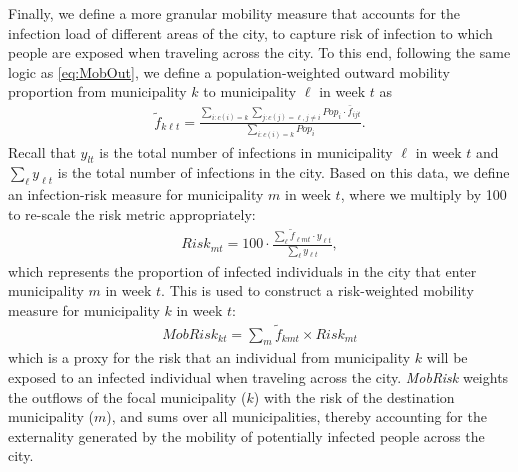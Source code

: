 
Finally, we define a more granular mobility measure that accounts for the infection load of different areas of the city, to capture risk of infection to which people are exposed when traveling across the city. To this end, following the same logic as \eqref{eq:MobOut},
we define a population-weighted outward mobility proportion from municipality $k$ to municipality $\ell$ in week $t$ as
\begin{align*}
    \tilde f_{k\ell t}=\frac{\sum_{i:c(i)=k}\sum_{j:c(j)=\ell, j\neq i}Pop_i\cdot \bar f_{ijt}}{\sum_{i:c(i)=k}Pop_i}.
\end{align*}
Recall that $y_{lt}$ is the total number of infections in municipality $\ell$ in week $t$ and $\sum_{\ell}  y_{\ell t}$ is the total number of infections in the city. Based on this data, we define an infection-risk measure for municipality $m$ in week $t$, where we multiply by 100 to re-scale the risk metric appropriately: 
\begin{align*}
     Risk_{mt}=100\cdot\frac{\sum_{\ell}\tilde f_{\ell mt}\cdot y_{\ell t}}{\sum_{\ell}y_{\ell t}} ,
\end{align*}
which represents the proportion of infected individuals in the city that enter municipality $m$ in week $t$. This is used to construct a risk-weighted mobility measure for municipality $k$ in week $t$:
\begin{align*}
    MobRisk_{kt}=\sum_{m}\tilde f_{kmt}\times Risk_{mt}  %
\end{align*}
which is a proxy for the risk that an individual from municipality $k$ will be exposed to an infected individual when traveling across the city. \textit{MobRisk} weights the outflows of the focal municipality ($k$) with the risk of the destination municipality ($m$), and sums over all municipalities, thereby accounting for the externality generated by the mobility of potentially infected people across the city.

